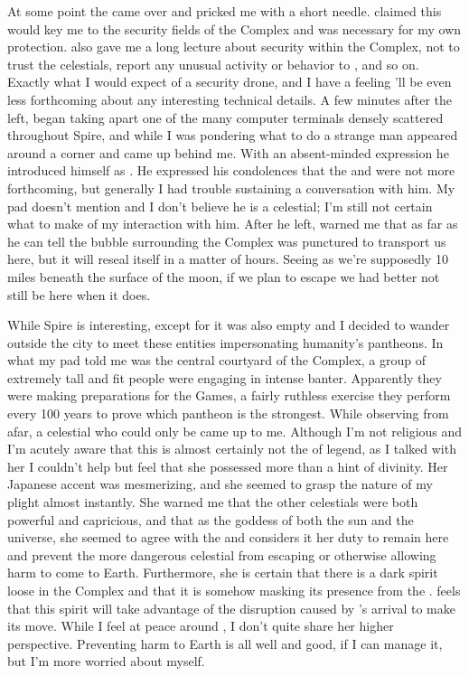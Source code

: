 \documentclass[char]{guardians}
\begin{document}
At some point the \cWarden{} came over and pricked me with a short needle. \cWarden{\They} claimed this would key me to the security fields of the Complex and was necessary for my own protection. \cWarden{\They} also gave me a long lecture about security within the Complex, not to trust the celestials, report any unusual activity or behavior to \cWarden{\them}, and so on. Exactly what I would expect of a security drone, and I have a feeling \cWarden{\they}'ll be even less forthcoming about any interesting technical details. A few minutes after the \cWarden{} left, \cUnity{} began taking apart one of the many computer terminals densely scattered throughout Spire, and while I was pondering what to do a strange man appeared around a corner and came up behind me. With an absent-minded expression he introduced himself as \cJascha{\intro}. He expressed his condolences that the \cCaretaker{} and \cWarden{} were not more forthcoming, but generally I had trouble sustaining a conversation with him. My pad doesn't mention \cJascha{} and I don't believe he is a celestial; I'm still not certain what to make of my interaction with him. After he left, \cUnity{} warned me that as far as he can tell the bubble surrounding the Complex was punctured to transport us here, but it will reseal itself in a matter of hours. Seeing as we're supposedly 10 miles beneath the surface of the moon, if we plan to escape we had better not still be here when it does.

While Spire is interesting, except for \cUnity{} it was also empty and I decided to wander outside the city to meet these entities impersonating humanity's pantheons. In what my pad told me was the central courtyard of the Complex, a group of extremely tall and fit people were engaging in intense banter. Apparently they were making preparations for the Games, a fairly ruthless exercise they perform every 100 years to prove which pantheon is the strongest. While observing from afar, a celestial who could only be \cAmaterasu{} came up to me. Although I'm not religious and I'm acutely aware that this is almost certainly not the \cAmaterasu{} of legend, as I talked with her I couldn't help but feel that she possessed more than a hint of divinity. Her Japanese accent was mesmerizing, and she seemed to grasp the nature of my plight almost instantly. She warned me that the other celestials were both powerful and capricious, and that as the goddess of both the sun and the universe, she seemed to agree with the \cWarden{} and considers it her duty to remain here and prevent the more dangerous celestial from escaping or otherwise allowing harm to come to Earth. Furthermore, she is certain that there is a dark spirit loose in the Complex and that it is somehow masking its presence from the \cWarden{}. \cAmaterasu{} feels that this spirit will take advantage of the disruption caused by \cUnity{}'s arrival to make its move. While I feel at peace around \cAmaterasu{}, I don't quite share her higher perspective. Preventing harm to Earth is all well and good, if I can manage it, but I'm more worried about myself.
\end{document}

